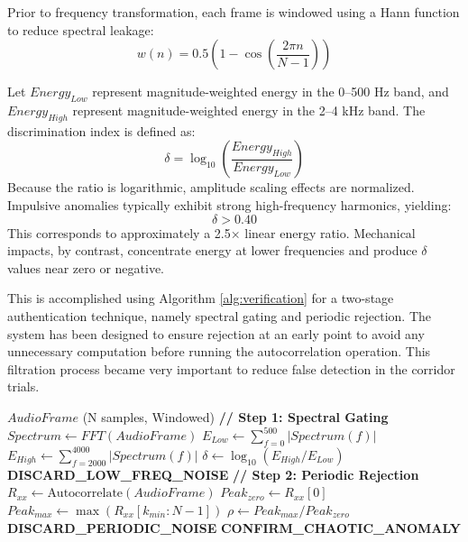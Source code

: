 \documentclass[conference]{IEEEtran}
\begin{document}
Prior to frequency transformation, each frame is windowed using a Hann function to reduce spectral leakage:
\begin{equation}
w(n) = 0.5 \left( 1 - \cos\left(\frac{2\pi n}{N-1}\right) \right)
\end{equation}

Let $Energy_{Low}$ represent magnitude-weighted energy in the 0–500 Hz band, and $Energy_{High}$ represent magnitude-weighted energy in the 2–4 kHz band. The discrimination index is defined as:
\begin{equation}
\delta = \log_{10}\left(\frac{Energy_{High}}{Energy_{Low}}\right)
\end{equation}
Because the ratio is logarithmic, amplitude scaling effects are normalized. Impulsive anomalies typically exhibit strong high-frequency harmonics, yielding:
\begin{equation}
\delta > 0.40
\end{equation}
This corresponds to approximately a 2.5× linear energy ratio. Mechanical impacts, by contrast, concentrate energy at lower frequencies and produce $\delta$ values near zero or negative.

This is accomplished using Algorithm \ref{alg:verification} for a two-stage authentication technique, namely spectral gating and periodic rejection. The system has been designed to ensure rejection at an early point to avoid any unnecessary computation before running the autocorrelation operation. This filtration process became very important to reduce false detection in the corridor trials.

\begin{algorithm}
\caption{Anomaly Verification Routine}
\begin{algorithmic}[1]
\REQUIRE $AudioFrame$ (N samples, Windowed)
\STATE \textbf{// Step 1: Spectral Gating}
\STATE $Spectrum \gets FFT(AudioFrame)$
\STATE $E_{Low} \gets \sum_{f=0}^{500} |Spectrum(f)|$ 
\STATE $E_{High} \gets \sum_{f=2000}^{4000} |Spectrum(f)|$ 
\STATE $\delta \gets \log_{10}(E_{High} / E_{Low})$
    \STATE \textbf{DISCARD\_LOW\_FREQ\_NOISE}
    \RETURN
\ENDIF
\STATE \textbf{// Step 2: Periodic Rejection}
\STATE $R_{xx} \gets \text{Autocorrelate}(AudioFrame)$
\STATE $Peak_{zero} \gets R_{xx}[0]$
\STATE $Peak_{max} \gets \max(R_{xx}[k_{min}:N-1])$
\STATE $\rho \gets Peak_{max} / Peak_{zero}$
    \STATE \textbf{DISCARD\_PERIODIC\_NOISE}
\ELSE
    \STATE \textbf{CONFIRM\_CHAOTIC\_ANOMALY}
\ENDIF
\end{algorithmic}
\label{alg:verification}
\end{algorithm}
\end{document}
